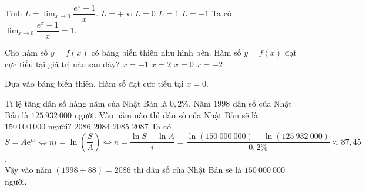 \begin{ex}%
	Tính $L=\displaystyle\lim_{x \to 0} \dfrac{e^{x}-1}{x}$.
	\choice
	{$L=+\infty$}
	{$L=0$}
	{\True $L=1$}
	{$L=-1$}
	\loigiai
	{ Ta có
		$\displaystyle\lim_{x \to 0} \dfrac{e^{x}-1}{x}=1$.
	}
\end{ex}

\begin{ex}%
	\immini
	{
		Cho hàm số $y=f(x)$ có bảng biến thiên như hình bên. Hàm số $y=f(x)$ đạt cực tiểu tại giá trị nào sau đây?
		\choice
		{$x=-1$}
		{$x=2$}
		{\True $x=0$}
		{$x=-2$}
	}
	{
	}
	\loigiai
	{
		Dựa vào bảng biến thiên. Hàm số đạt cực tiểu tại $x=0$.
	}
\end{ex}

\begin{ex}%
	Tỉ lệ tăng dân số hàng năm của Nhật Bản là $0{,}2\%$. Năm $1998$ dân số của Nhật Bản là $125~932~000$ người. Vào năm nào thì dân số của Nhật Bản sẽ là $150~000~000$ người?
	\choice
	{\True $2086$}
	{$2084$}
	{$2085$}
	{$2087$}
	\loigiai
	{
		Ta có $S=A\mathrm{e}^{ni} \Leftrightarrow ni=\ln\left(\dfrac{S}{A}\right) \Leftrightarrow n=\dfrac{\ln S- \ln A}{i}=\dfrac{\ln (150~000~000)-\ln (125~932~000)}{0{,}2\%}\approx 87{,}45$.\\
		Vậy vào năm $(1998+88)=2086$ thì dân số của Nhật Bản sẽ là $150~000~000$ người.
	}
\end{ex}

